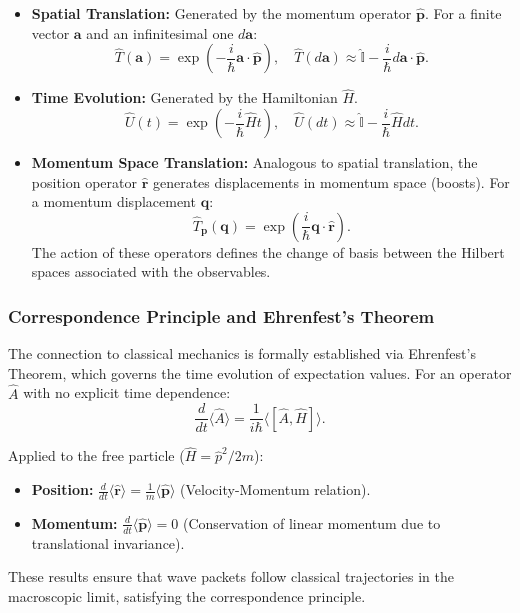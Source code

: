 \begin{itemize}
    \item \textbf{Spatial Translation:} Generated by the momentum operator $\hat{\mathbf{p}}$. For a finite vector $\mathbf{a}$ and an infinitesimal one $d\mathbf{a}$:
    \begin{equation}
        \hat{T}(\mathbf{a}) = \exp\left(-\frac{i}{\hbar}\mathbf{a}\cdot\hat{\mathbf{p}}\right), \quad \hat{T}(d\mathbf{a}) \approx \hat{\mathbb{I}} - \frac{i}{\hbar}d\mathbf{a}\cdot\hat{\mathbf{p}}.
    \end{equation}
    
    \item \textbf{Time Evolution:} Generated by the Hamiltonian $\hat{H}$.
    \begin{equation}
        \hat{U}(t) = \exp\left(-\frac{i}{\hbar}\hat{H}t\right), \quad \hat{U}(dt) \approx \hat{\mathbb{I}} - \frac{i}{\hbar}\hat{H}dt.
    \end{equation}
    
    \item \textbf{Momentum Space Translation:} Analogous to spatial translation, the position operator $\hat{\mathbf{r}}$ generates displacements in momentum space (boosts). For a momentum displacement $\mathbf{q}$:
    \begin{equation}
        \hat{T}_{\mathbf{p}}(\mathbf{q}) = \exp\left(\frac{i}{\hbar}\mathbf{q}\cdot\hat{\mathbf{r}}\right).
    \end{equation}
    The action of these operators defines the change of basis between the Hilbert spaces associated with the observables.
\end{itemize}

\subsubsection{Correspondence Principle and Ehrenfest's Theorem}

The connection to classical mechanics is formally established via Ehrenfest's Theorem, which governs the time evolution of expectation values. For an operator $\hat{A}$ with no explicit time dependence:
\begin{equation}
    \frac{d}{dt}\langle \hat{A} \rangle = \frac{1}{i\hbar}\langle [\hat{A}, \hat{H}] \rangle.
\end{equation}

Applied to the free particle ($\hat{H} = \hat{p}^2/2m$):
\begin{itemize}
    \item \textbf{Position:} $\frac{d}{dt}\langle \hat{\mathbf{r}} \rangle = \frac{1}{m}\langle \hat{\mathbf{p}} \rangle$ (Velocity-Momentum relation).
    \item \textbf{Momentum:} $\frac{d}{dt}\langle \hat{\mathbf{p}} \rangle = 0$ (Conservation of linear momentum due to translational invariance).
\end{itemize}
These results ensure that wave packets follow classical trajectories in the macroscopic limit, satisfying the correspondence principle.